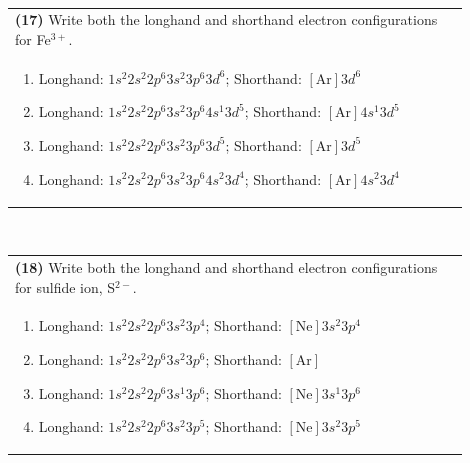 \documentclass{article}
\begin{document}
\\ \newpage 
\noindent \begin{tabular}{|p{0.9\linewidth}|}
\hline
\vspace{0.2cm}
\textbf{(17)} Write both the longhand and shorthand electron configurations for Fe$^{3+}$. \\
\begin{minipage}[t]{0.85\linewidth}
\begin{enumerate}[label=\alph*.]
\item Longhand: $1s^{2}2s^{2}2p^{6}3s^{2}3p^{6}3d^{6}$; Shorthand: $[\text{Ar}]3d^{6}$
\item Longhand: $1s^{2}2s^{2}2p^{6}3s^{2}3p^{6}4s^{1}3d^{5}$; Shorthand: $[\text{Ar}]4s^{1}3d^{5}$
\item Longhand: $1s^{2}2s^{2}2p^{6}3s^{2}3p^{6}3d^{5}$; Shorthand: $[\text{Ar}]3d^{5}$
\item Longhand: $1s^{2}2s^{2}2p^{6}3s^{2}3p^{6}4s^{2}3d^{4}$; Shorthand: $[\text{Ar}]4s^{2}3d^{4}$
\end{enumerate}
\end{minipage}\\
\hline
\end{tabular}
\\

\vspace{0.5cm}
\noindent \begin{tabular}{|p{0.9\linewidth}|}
\hline
\vspace{0.2cm}
\textbf{(18)} Write both the longhand and shorthand electron configurations for sulfide ion, S$^{2-}$. \\
\begin{minipage}[t]{0.85\linewidth}
\begin{enumerate}[label=\alph*.]
\item Longhand: $1s^{2}2s^{2}2p^{6}3s^{2}3p^{4}$; Shorthand: $[\text{Ne}]3s^{2}3p^{4}$
\item Longhand: $1s^{2}2s^{2}2p^{6}3s^{2}3p^{6}$; Shorthand: $[\text{Ar}]$
\item Longhand: $1s^{2}2s^{2}2p^{6}3s^{1}3p^{6}$; Shorthand: $[\text{Ne}]3s^{1}3p^{6}$
\item Longhand: $1s^{2}2s^{2}2p^{6}3s^{2}3p^{5}$; Shorthand: $[\text{Ne}]3s^{2}3p^{5}$
\end{enumerate}
\end{minipage}\\
\hline
\end{tabular}
\\
\end{document}
